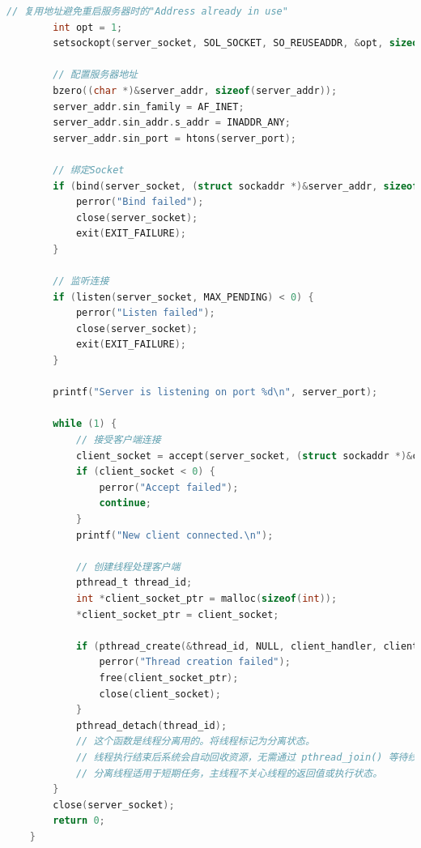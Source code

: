 \documentclass[14pt,a4paper,UTF8,twoside]{article}
\begin{document}
\begin{lstlisting}[language=C]
        // 复用地址避免重启服务器时的"Address already in use"
        int opt = 1;
        setsockopt(server_socket, SOL_SOCKET, SO_REUSEADDR, &opt, sizeof(opt));
    
        // 配置服务器地址
        bzero((char *)&server_addr, sizeof(server_addr));
        server_addr.sin_family = AF_INET;
        server_addr.sin_addr.s_addr = INADDR_ANY;
        server_addr.sin_port = htons(server_port);
    
        // 绑定Socket
        if (bind(server_socket, (struct sockaddr *)&server_addr, sizeof(server_addr)) < 0) {
            perror("Bind failed");
            close(server_socket);
            exit(EXIT_FAILURE);
        }
    
        // 监听连接
        if (listen(server_socket, MAX_PENDING) < 0) {
            perror("Listen failed");
            close(server_socket);
            exit(EXIT_FAILURE);
        }
    
        printf("Server is listening on port %d\n", server_port);
    
        while (1) {
            // 接受客户端连接
            client_socket = accept(server_socket, (struct sockaddr *)&client_addr, &client_addr_len);
            if (client_socket < 0) {
                perror("Accept failed");
                continue;
            }
            printf("New client connected.\n");
    
            // 创建线程处理客户端
            pthread_t thread_id;
            int *client_socket_ptr = malloc(sizeof(int));
            *client_socket_ptr = client_socket;
    
            if (pthread_create(&thread_id, NULL, client_handler, client_socket_ptr) != 0) {
                perror("Thread creation failed");
                free(client_socket_ptr);
                close(client_socket);
            }
            pthread_detach(thread_id);
            // 这个函数是线程分离用的。将线程标记为分离状态。
            // 线程执行结束后系统会自动回收资源，无需通过 pthread_join() 等待线程结束。
            // 分离线程适用于短期任务，主线程不关心线程的返回值或执行状态。
        }
        close(server_socket);
        return 0;
    }    

\end{lstlisting}
\end{document}
